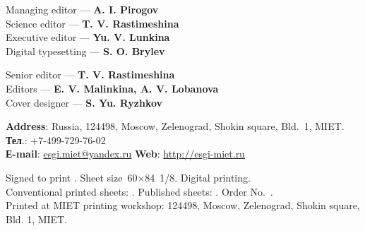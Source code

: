 \begin{otherlanguage}{english}
\begin{minipage}[t]{.48\textwidth}
\begin{flushleft}
  \footnotesize
        Managing editor — \textbf{A. I. Pirogov}\\
Science editor — \textbf{T. V. Rastimeshina} \\
Executive editor — \textbf{Yu. V. Lunkina }\\
Digital typesetting — \textbf{S. O. Brylev}
    \end{flushleft}
\end{minipage}\hspace{0.04\textwidth}
\begin{minipage}[t]{.48\textwidth}
    \begin{flushleft}
        \footnotesize
        Senior editor — \textbf{T. V. Rastimeshina}\\
        Editors — \textbf{E. V. Malinkina, A. V. Lobanova}\\
        Cover designer — \textbf{S. Yu. Ryzhkov}
    \end{flushleft}
\end{minipage}

\begin{flushleft}
    \footnotesize
    \textbf{Address}: Russia, 124498, Moscow, Zelenograd, Shokin square, Bld. 1, MIET.\\
    \textbf{Тел}.: +7-499-729-76-02\\
    \textbf{Е-mail}: \href{mailto:esgi.miet@yandex.ru}{esgi.miet@yandex.ru} \hspace{3em}
    \textbf{Web}: \url{http://esgi-miet.ru}

     \vspace{1em}
    Signed to print \esgiPDate. Sheet size 60\(×\)84 1/8. Digital printing.\\
    Conventional printed sheets: \esgiUPL{}. Published sheets: \esgiUIL{}. Order No.~\esgiPRN{}.\\
    Printed at MIET printing workshop: 124498, Moscow, Zelenograd, Shokin square, Bld. 1, MIET.
\end{flushleft}

\end{otherlanguage}

\normalsize
\setmainlinespread
